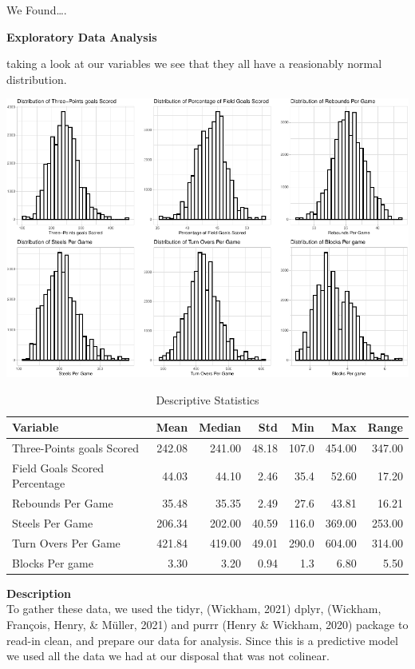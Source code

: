 \documentclass[
  english,
  man,floatsintext]{apa6}
\begin{document}
We Found\ldots.

\textbf{Exploratory Data Analysis}

taking a look at our variables we see that they all have a reasionably normal distribution.

\includegraphics{paper_files/figure-latex/unnamed-chunk-1-1.pdf}

\begin{longtable}[t]{lrrrrrr}
\caption{\label{tab:unnamed-chunk-2}Descriptive Statistics}\\
\toprule
Variable & Mean & Median & Std & Min & Max & Range\\
\midrule
Three-Points goals Scored & 242.08 & 241.00 & 48.18 & 107.0 & 454.00 & 347.00\\
Field Goals Scored Percentage & 44.03 & 44.10 & 2.46 & 35.4 & 52.60 & 17.20\\
Rebounds Per Game & 35.48 & 35.35 & 2.49 & 27.6 & 43.81 & 16.21\\
Steels Per Game & 206.34 & 202.00 & 40.59 & 116.0 & 369.00 & 253.00\\
Turn Overs Per Game & 421.84 & 419.00 & 49.01 & 290.0 & 604.00 & 314.00\\
\addlinespace
Blocks Per game & 3.30 & 3.20 & 0.94 & 1.3 & 6.80 & 5.50\\
\bottomrule
\end{longtable}

\textbf{Description}\\
To gather these data, we used the tidyr, (Wickham, 2021) dplyr, (Wickham, François, Henry, \& Müller, 2021) and purrr (Henry \& Wickham, 2020) package to read-in clean, and prepare our data for analysis.
Since this is a predictive model we used all the data we had at our disposal that was not colinear.
\end{document}
